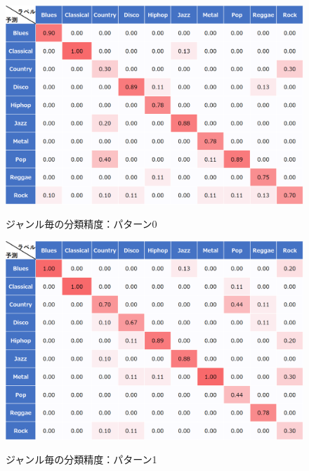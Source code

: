 \begin{figure}[htbp]
	\begin{center}
		\includegraphics[scale=0.48]{./images/classify-model/mel0_matrix.png}
		\caption{ジャンル毎の分類精度：パターン0}
		\label{fig:CNN0}
		\vspace{50pt}
		\includegraphics[scale=0.5]{./images/classify-model/mel1_matrix.png}
		\caption{ジャンル毎の分類精度：パターン1}
		\label{fig:CNN1}
	\end{center}
\end{figure}
\newpage
